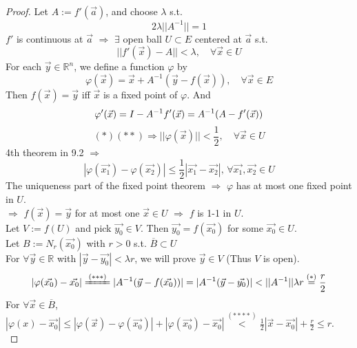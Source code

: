 \begin{proof}
    Let  $ A:=f'(\vec{a}) $, and choose  $ \lambda  $ s.t.
    \begin{equation}
        2\lambda||A^{-1}||=1\tag{ $ \ast $ }
    \end{equation} 
     $ f' $ is continuous at  $ \vec{a } $  $ \Rightarrow  $  $ \exists  $ open ball  $ U\subset E  $ centered at  $ \vec{a}  $ s.t.
     \begin{equation}
        ||f'(\vec{x})-A||<\lambda,\quad\forall \vec{x}\in U\tag{ $ \ast\ast $ }
     \end{equation}
     For each  $ \vec{y }\in \mathbb{R}^n  $, we define a function  $ \varphi  $ by 
     \begin{equation}
        \varphi(\vec{x})=\vec{x}+A^{-1}(\vec{y}-f(\vec{x})),\quad \forall\vec{x}\in E\tag{ $ \ast\ast\ast $ }
     \end{equation}
     Then  $ f(\vec{x})=\vec{y} $ iff  $ \vec{x} $ is a fixed point of  $ \varphi  $. And 
     \begin{equation}
        \varphi'(\vec{x})=I-A^{-1}f'(\vec{x})=A^{-1}(A-f'(\vec{x}))\notag
     \end{equation} 
     \[(\ast)(\ast\ast)\Rightarrow||\varphi(\vec{x})||<\frac{1 }{2 },\quad\forall \vec{x}
     \in U\]
     4th theorem in 9.2  $ \Rightarrow  $   
     \[ |\varphi(\vec{x_1})-\varphi(\vec{x_2})| \leqslant \frac{1 }{2 }|\vec{x_1}-\vec{x_2}|,\,\forall \vec{x_1},\vec{x_2}\in U \tag{ $ \ast\ast\ast\ast $ }\]
     The uniqueness part of the fixed point theorem  $ \Rightarrow  $  $ \varphi  $ has at most one fixed point in  $ U  $.\\
      $ \Rightarrow  $  $ f(\vec{x})=\vec{y} $ for at most one  $ \vec{x}\in U  $ $ \Rightarrow  $  $ f  $ is 1-1 in  $ U $.\\
      Let  $ V:=f(U) $ and pick  $ \vec{y_0 }\in V  $. Then  $ \vec{y_0 }=f(\vec{x_0 }) $ for some  $ \vec{x_0}\in U $.\\
      Let  $ B:=N_r(\vec{x_0}) $ with  $ r>0  $ s.t.  $ \overline{B } \subset U  $\\
      For  $ \forall \vec{y }\in \mathbb{R}  $ with  $ |\vec{y}-\vec{y_0}|<\lambda r $, we will prove  $ \vec{y }\in V  $ (Thus  $ V  $ is open).
      \[|\varphi(\vec{x_0})-\vec{x_0}|\xlongequal[]{(\ast\ast\ast)}|A^{-1}(\vec{y}-f(\vec{x_0}))|=|A^{-1}(\vec{y}-\vec{y_0})|<||A^{-1}||\lambda r \overset{(\ast)}{=}\frac{r }{2}\]
      For  $ \forall \vec{x }\in \overline{B} $,  $ |\varphi(x)-\vec{x_0}| \leqslant |\varphi(\vec{x})-\varphi(\vec{x_0})|+|\varphi(\vec{x_0})-\vec{x_0}|\overset{(\ast\ast\ast\ast)}{<}\frac{1 }{2 }|\vec{x}-\vec{x_0}|+\frac{r }{2 } \leqslant r $.\\

\end{proof}
